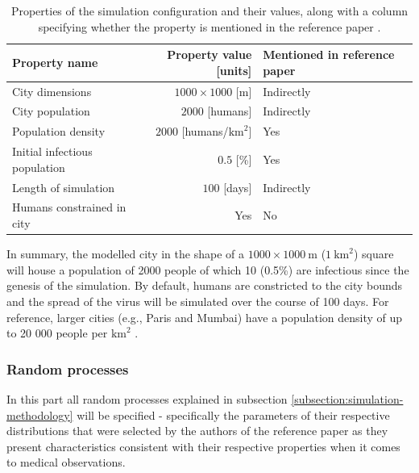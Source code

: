\documentclass[a4paper]{article}
\begin{document}
\begin{table}[!h]
	\centering
	\caption{Properties of the simulation configuration and their values, along with a column specifying whether the property is mentioned in the reference paper \cite{Maltezos2021}.}
	\begin{tabular}{ |l|r|l|  }
		\hline
		Property name & Property value [units] & Mentioned in reference paper \\
		\hline
		\hline
		City dimensions               & $1000 \times 1000$ [m]          & Indirectly \\
		City population               & $2000$ [humans]                 & Indirectly \\
		Population density            & $2000$ [humans/$\textrm{km}^2$] & Yes \\
		Initial infectious population & $0.5$ [\%]                      & Yes 	  	 \\
		Length of simulation          & $100$ [days]                    & Indirectly \\
		Humans constrained in city    & Yes                             & No         \\
		\hline
	\end{tabular}
	\label{table:simulation-configuration}
\end{table}

In summary, the modelled city in the shape of a $1000\times1000\:\textrm{m}$ ($1\: \textrm{km}^2$) square will house a population of 2000 people of which 10 (0.5\%) are infectious since the genesis of the simulation. By default, humans are constricted to the city bounds and the spread of the virus will be simulated over the course of 100 days. For reference, larger cities (e.g., Paris and Mumbai) have a population density of up to 20 000 people per $\textrm{km}^2$ \cite{GnfKtXcXYiGm8NmR}\cite{YyQLmGbzBu9Drxx5}.


\subsubsection{Random processes}
In this part all random processes explained in subsection \ref{subsection:simulation-methodology} will be specified - specifically the parameters of their respective distributions that were selected by the authors of the reference paper \cite{Maltezos2021} as they present characteristics consistent with their respective properties when it comes to medical observations.
\end{document}
